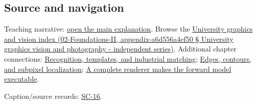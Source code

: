 \subsection{Source and navigation}\label{source-and-navigation}

Teaching narrative: \href{Continuous\%20Notes/University\%20-\%20Worlds,\%20Images\%20and\%20Inference\%20-\%20Graphics,\%20Vision\%20and\%20Photography\#Self-supervision\%20and\%20evaluation}{open the main explanation}. Browse the \href{}{University graphics and vision index (02-Foundations-II, appendix-a6d556a4ef50 § University graphics vision and photography - independent series)}. Additional chapter connections: \href{Continuous\%20Notes/University\%20-\%20Worlds,\%20Images\%20and\%20Inference\%20-\%20Graphics,\%20Vision\%20and\%20Photography\#Recognition,\%20templates,\%20and\%20industrial\%20matching}{Recognition, templates, and industrial matching}; \href{Continuous\%20Notes/University\%20-\%20Worlds,\%20Images\%20and\%20Inference\%20-\%20Graphics,\%20Vision\%20and\%20Photography\#Edges,\%20contours,\%20and\%20subpixel\%20localization}{Edges, contours, and subpixel localization}; \href{Continuous\%20Notes/University\%20-\%20Worlds,\%20Images\%20and\%20Inference\%20-\%20Graphics,\%20Vision\%20and\%20Photography\#A\%20complete\%20renderer\%20makes\%20the\%20forward\%20model\%20executable}{A complete renderer makes the forward model executable}.

Caption/source records: \href{Continuous\%20Notes/University\%20-\%20Worlds,\%20Images\%20and\%20Inference\%20-\%20Graphics,\%20Vision\%20and\%20Photography\#SC-16\%20-\%20Stanford\%20CS231N\%20Deep\%20Learning\%20for\%20Computer\%20Vision\%20Spring\%202025\%20Lecture\%2016:\%20Vision\%20and\%20Language}{SC-16}.
